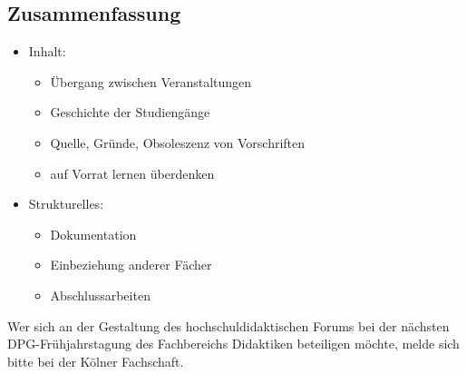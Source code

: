     \subsection*{Zusammenfassung}
      \begin{itemize}
        \item Inhalt:
          \begin{itemize}
            \item Übergang zwischen Veranstaltungen
            \item Geschichte der Studiengänge
            \item Quelle, Gründe, Obsoleszenz von Vorschriften
            \item auf Vorrat lernen überdenken
          \end{itemize}
        \item Strukturelles:
          \begin{itemize}
            \item Dokumentation
            \item Einbeziehung anderer Fächer
            \item Abschlussarbeiten
          \end{itemize}
      \end{itemize}
      Wer sich an der Gestaltung des hochschuldidaktischen Forums bei der nächsten DPG-Frühjahrstagung des Fachbereichs Didaktiken beteiligen möchte, melde sich bitte bei der Kölner Fachschaft.
